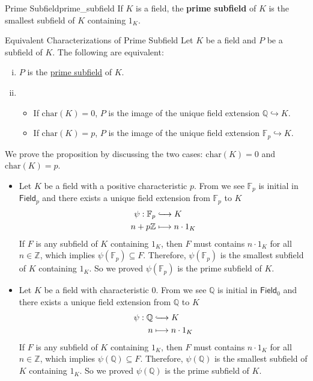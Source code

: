 \begin{definition}{Prime Subfield}{prime_subfield}
    If $K$ is a field, the \textbf{prime subfield} of $K$ is the smallest subfield of $K$ containing $1_K$.
\end{definition}

\begin{proposition}{Equivalent Characterizations of Prime Subfield}{}
    Let $K$ be a field and $P$ be a subfield of $K$. The following are equivalent:
    \begin{enumerate}[(i)]
        \item $P$ is the \hyperref[th:prime_subfield]{prime subfield} of $K$.
        \item \begin{itemize}
            \item If $\mathrm{char}(K)=0$, $P$ is the image of the unique field extension $\mathbb{Q}\hookrightarrow K$.
            \item If $\mathrm{char}(K)=p$, $P$ is the image of the unique field extension $\mathbb{F}_p\hookrightarrow K$.
        \end{itemize}
    \end{enumerate}
\end{proposition}
\begin{prf}
    We prove the proposition by discussing the two cases: $\mathrm{char}(K)=0$ and $\mathrm{char}(K)=p$.
    \begin{itemize}
        \item Let $K$ be a field with a positive characteristic $p$. From  we see $\mathbb{F}_p$ is initial in $\mathsf{Field}_p$ and there exists a unique field extension from $\mathbb{F}_p$ to $K$
        \begin{align*}
            \psi:\mathbb{F}_p&\xhookrightarrow{\quad} K\\
                 n + p\mathbb{Z}&\longmapsto n \cdot 1_K
        \end{align*}
        If $F$ is any subfield of $K$ containing $1_K$, then $F$ must contains $n \cdot 1_K$ for all $n\in \mathbb{Z}$, which implies $\psi(\mathbb{F}_p)\subseteq F$. Therefore, $\psi(\mathbb{F}_p)$ is the smallest subfield of $K$ containing $1_K$. So we proved $\psi(\mathbb{F}_p)$ is the prime subfield of $K$.
        \item Let $K$ be a field with characteristic $0$. From  we see $\mathbb{Q}$ is initial in $\mathsf{Field}_0$ and there exists a unique field extension from $\mathbb{Q}$ to $K$
        \begin{align*}
            \psi:\mathbb{Q}&\xhookrightarrow{\quad} K\\
                 n &\longmapsto n \cdot 1_K
        \end{align*}
        If $F$ is any subfield of $K$ containing $1_K$, then $F$ must contains $n \cdot 1_K$ for all $n\in \mathbb{Z}$, which implies $\psi(\mathbb{Q})\subseteq F$. Therefore, $\psi(\mathbb{Q})$ is the smallest subfield of $K$ containing $1_K$. So we proved $\psi(\mathbb{Q})$ is the prime subfield of $K$.
    \end{itemize}
    
\end{prf}

